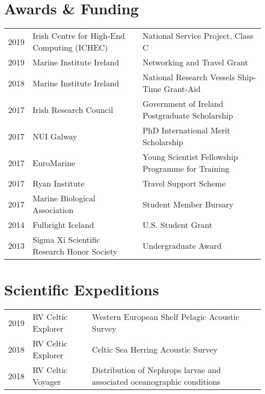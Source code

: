 \documentclass[a4paper]{deedy-resume} %
\begin{document}
\begin{flushleft}
\section{Awards \& Funding}

\begin{tabular}{ l l l }
2019 & Irish Centre for High-End Computing (ICHEC) & National Service Project, Class C \\
2019 & Marine Institute Ireland & Networking and Travel Grant \\
2018 & Marine Institute Ireland & National Research Vessels Ship-Time Grant-Aid \\
2017 & Irish Research Council & Government of Ireland Postgraduate Scholarship \\
2017 & NUI Galway & PhD International Merit Scholarship \\
2017 & EuroMarine & Young Scientist Fellowship Programme for Training \\
2017 & Ryan Institute & Travel Support Scheme \\
2017 & Marine Biological Association & Student Member Bursary \\
2014 & Fulbright Iceland & U.S. Student Grant \\
2013 & Sigma Xi Scientific Research Honor Society & Undergraduate Award

\end{tabular}

\sectionspace %



\sectionspace %

\section{Scientific Expeditions}

\begin{tabular}{l l l}
2019 & RV Celtic Explorer & Western European Shelf Pelagic Acoustic Survey \\
2018 & RV Celtic Explorer & Celtic Sea Herring Acoustic Survey \\
2018 & RV Celtic Voyager & Distribution of Nephrops larvae and associated oceanographic conditions \\
\end{tabular}

\sectionspace %

\end{flushleft}
\end{document}
